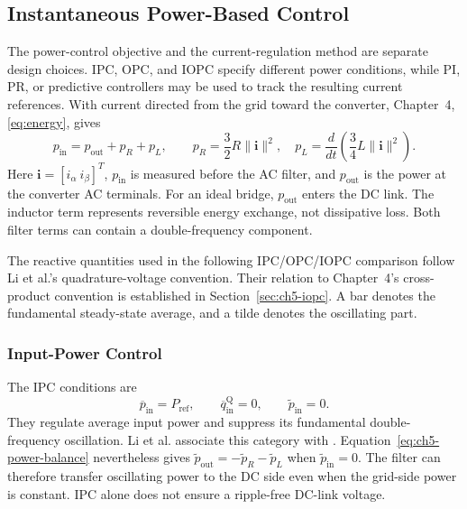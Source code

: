 \subsection{Instantaneous Power-Based Control}
The power-control objective and the current-regulation method are separate design choices. IPC, OPC, and IOPC specify different power conditions, while PI, PR, or predictive controllers may be used to track the resulting current references. With current directed from the grid toward the converter, Chapter~4, \eqref{eq:energy}, gives
\begin{equation}
p_{\mathrm{in}}=p_{\mathrm{out}}+p_R+p_L,\qquad
p_R=\frac32R\lVert\mathbf i\rVert^2,\quad
p_L=\frac{d}{dt}\left(\frac34L\lVert\mathbf i\rVert^2\right).
\label{eq:ch5-power-balance}
\end{equation}
Here $\mathbf i=[i_\alpha\ i_\beta]^T$, $p_{\mathrm{in}}$ is measured before the AC filter, and $p_{\mathrm{out}}$ is the power at the converter AC terminals. For an ideal bridge, $p_{\mathrm{out}}$ enters the DC link. The inductor term represents reversible energy exchange, not dissipative loss. Both filter terms can contain a double-frequency component.

The reactive quantities used in the following IPC/OPC/IOPC comparison follow Li et al.'s quadrature-voltage convention. Their relation to Chapter~4's cross-product convention is established in Section~\ref{sec:ch5-iopc}. A bar denotes the fundamental steady-state average, and a tilde denotes the oscillating part.

\subsubsection{Input-Power Control}
The IPC conditions are
\begin{equation}
\overline p_{\mathrm{in}}=P_{\mathrm{ref}},\qquad
\overline q_{\mathrm{in}}^{\mathrm Q}=0,\qquad
\widetilde p_{\mathrm{in}}=0.
\label{eq:ch5-ipc-objectives}
\end{equation}
They regulate average input power and suppress its fundamental double-frequency oscillation. Li et al. associate this category with \cite{ch5-rioual1996,song1999}. Equation~\eqref{eq:ch5-power-balance} nevertheless gives $\widetilde p_{\mathrm{out}}=-\widetilde p_R-\widetilde p_L$ when $\widetilde p_{\mathrm{in}}=0$. The filter can therefore transfer oscillating power to the DC side even when the grid-side power is constant. IPC alone does not ensure a ripple-free DC-link voltage.

